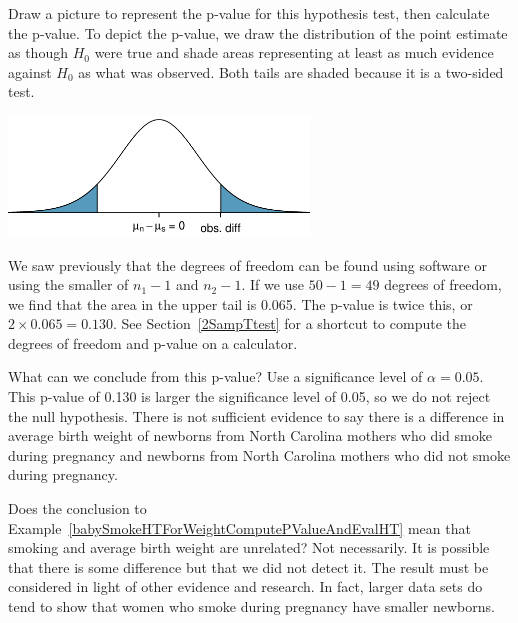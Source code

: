 \begin{examplewrap}
\begin{nexample}{Draw a picture to represent the p-value for this hypothesis test, then calculate the p-value.}
\label{pictureOfPValueForEstimateOfDiffOfMeansOfBirthWeights}
To depict the p-value, we draw the distribution of the point estimate as though $H_0$ were true and shade areas representing at least as much evidence against $H_0$ as what was observed. Both tails are shaded because it is a two-sided test.
\begin{center}
\includegraphics[width=0.6\textwidth]{ch_inference_for_means/figures/distOfDiffOfSampleMeansForBWOfBabySmokeData/distOfDiffOfSampleMeansForBWOfBabySmokeData}
\end{center}
We saw previously that the degrees of freedom can be found using software or using the smaller of $n_1-1$ and $n_2-1$.  If we use $50-1=49$ degrees of freedom, we find that the area in the upper tail is 0.065.  The p-value is twice this, or $2\times 0.065= 0.130$.  See Section~\ref{2SampTtest} for a shortcut to compute the degrees of freedom and p-value on a calculator.
\end{nexample}
\end{examplewrap}

\begin{examplewrap}
\begin{nexample}{What can we conclude from this p-value?  Use a significance level of $\alpha=0.05$.  }
\label{pictureOfPValueForEstimateOfDiffOfMeansOfBirthWeights}
This p-value of 0.130 is larger the significance level of 0.05, so we do not reject the null hypothesis. There is not sufficient evidence to say there is a difference in average birth weight of newborns from North Carolina mothers who did smoke during pregnancy and newborns from North Carolina mothers who did not smoke during pregnancy.
\end{nexample}
\end{examplewrap}




\begin{examplewrap}
\begin{nexample}
{Does the conclusion to Example~\ref{babySmokeHTForWeightComputePValueAndEvalHT} mean that smoking and average birth weight are unrelated?}
Not necessarily. It is possible that there is some difference but that we did not detect it.  The result must be considered in light of other evidence and research.  In fact, larger data sets do tend to show that women who smoke during pregnancy have smaller newborns.
\end{nexample}
\end{examplewrap}


